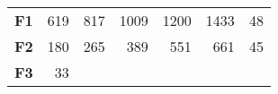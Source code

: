 \documentclass[12pt,a4paper]{article}
\begin{document}
\begin{longtable}[c]{@{}crrrrrr@{}}
\midrule
\endhead
\begin{minipage}[t]{0.11\columnwidth}\centering\strut
\textbf{F1}
\strut\end{minipage} &
\begin{minipage}[t]{0.08\columnwidth}\raggedleft\strut
619
\strut\end{minipage} &
\begin{minipage}[t]{0.08\columnwidth}\raggedleft\strut
817
\strut\end{minipage} &
\begin{minipage}[t]{0.09\columnwidth}\raggedleft\strut
1009
\strut\end{minipage} &
\begin{minipage}[t]{0.10\columnwidth}\raggedleft\strut
1200
\strut\end{minipage} &
\begin{minipage}[t]{0.11\columnwidth}\raggedleft\strut
1433
\strut\end{minipage} &
\begin{minipage}[t]{0.07\columnwidth}\raggedleft\strut
48
\strut\end{minipage}\tabularnewline
\begin{minipage}[t]{0.11\columnwidth}\centering\strut
\textbf{F2}
\strut\end{minipage} &
\begin{minipage}[t]{0.08\columnwidth}\raggedleft\strut
180
\strut\end{minipage} &
\begin{minipage}[t]{0.08\columnwidth}\raggedleft\strut
265
\strut\end{minipage} &
\begin{minipage}[t]{0.09\columnwidth}\raggedleft\strut
389
\strut\end{minipage} &
\begin{minipage}[t]{0.10\columnwidth}\raggedleft\strut
551
\strut\end{minipage} &
\begin{minipage}[t]{0.11\columnwidth}\raggedleft\strut
661
\strut\end{minipage} &
\begin{minipage}[t]{0.07\columnwidth}\raggedleft\strut
45
\strut\end{minipage}\tabularnewline
\begin{minipage}[t]{0.11\columnwidth}\centering\strut
\textbf{F3}
\strut\end{minipage} &
\begin{minipage}[t]{0.08\columnwidth}\raggedleft\strut
33
\strut\end{minipage} &

\end{longtable}
\end{document}
